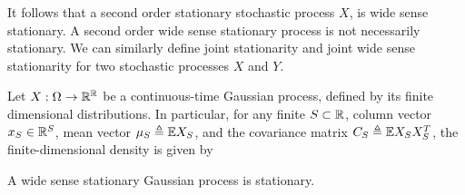 \documentclass[letterpaper,10pt,english]{article}
\begin{document}
\begin{rem}
It follows that a second order stationary stochastic process $X$,  is wide sense stationary. 
A second order wide sense stationary process is not necessarily stationary. 
We can similarly define joint stationarity and joint wide sense stationarity for two stochastic processes $X$ and $Y$.
\end{rem}
\begin{shaded}
\begin{exmp} 
Let $X: \Omega \to \mathbb{R}^{\mathbb{R}}$ be a continuous-time Gaussian process, defined by its finite dimensional distributions. 
In particular, for any finite $S \subset \mathbb{R}$, column vector $x_S \in \mathbb{R}^S$,
mean vector $\mu_S \triangleq \mathbb{E} X_S$, 
and the covariance matrix $C_S \triangleq \mathbb{E} X_SX_S^T$, 
the finite-dimensional density is given by 
\end{exmp}
\begin{thm} 
A wide sense stationary Gaussian process is stationary. 
\end{thm}
\end{shaded}
\end{document}
